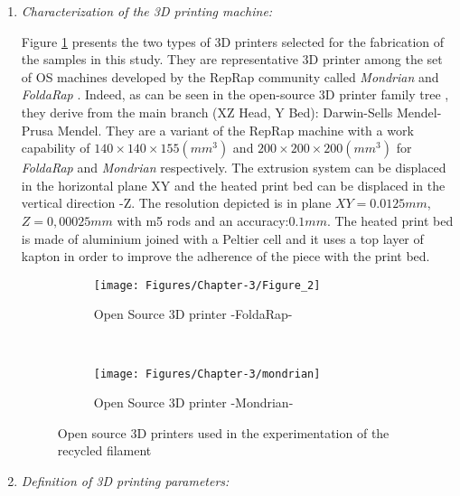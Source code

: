 \begin{enumerate}[leftmargin=0in, label=\emph{\alph*}.]
	\item \textit{Characterization of the 3D printing machine:} 
	
	Figure \ref{FoldaRap} presents the two types of 3D printers selected for the fabrication of the samples in this study. 
	They are representative 3D printer among the set of OS machines developed by the RepRap community called \emph{Mondrian} and \emph{FoldaRap} \parencite{Open2015, mondrian2015, CruzSanchez2014}. 
	Indeed, as can be seen in the open-source 3D printer family tree \parencite{Pearce2014k}, they derive from the main branch (XZ Head, Y Bed): Darwin-Sells Mendel-Prusa Mendel. 
	They are a variant of the RepRap machine with a work capability of   $140\times140\times155 (mm^3)$ and  $200\times200\times200 (mm^3)$ for \textit{FoldaRap} and \textit{Mondrian} respectively.  
	The extrusion system can be displaced  in the horizontal plane XY and the heated print bed can be displaced in the vertical direction -Z. 
	The resolution depicted is in plane $XY = 0.0125 mm$, $Z = 0,00025 mm$ with m5 rods and an accuracy:$0.1 mm$.
	The heated print bed is made of aluminium joined with a Peltier cell and it uses a top layer of kapton in order to improve the adherence of the piece with the print bed.
	
	
	\begin{figure} [H]
		\centering
		\begin{subfigure}[t]{0.45\textwidth}
			\centering
			\texttt{[image: Figures/Chapter-3/Figure\_2]}
			\caption{Open Source 3D printer -FoldaRap-}
			\label{FoldaRap}
		\end{subfigure}%
		~ 
		\begin{subfigure}[t]{0.45\textwidth}
			\centering
			\texttt{[image: Figures/Chapter-3/mondrian]}		
			\caption{Open Source 3D printer -Mondrian-}
			\label{mondrian}
		\end{subfigure}
		
		\caption{Open source 3D printers used in the experimentation of the recycled filament}
		
	\end{figure}
	
	\item \textit{Definition of 3D printing parameters:}
	

\end{enumerate}
